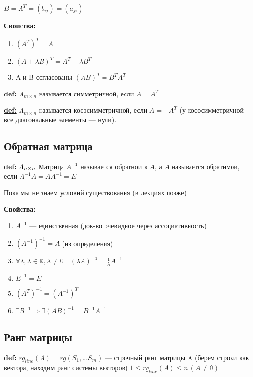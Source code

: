 \( B = A^T = (b_{ij}) = (a_{ji}) \)

\textbf{Свойства:}
\begin{enumerate}
    \item $ (A^T)^T = A $
    \item $ (A+\lambda B)^T = A^T+\lambda B^T $
    \item A и B согласованы $ (AB)^T = B^T A^T $ 
\end{enumerate}

\textbf{\underline{def:}} $ A_{m \times n} $ называется симметричной, если $ A = A^T$

\textbf{\underline{def:}} $ A_{m \times n} $ называется кососимметричной, если $ A = -A^T$ (у кососимметричной все диагональные элементы --- нули).

\subsection{Обратная матрица}

\textbf{\underline{def:}}
\( A_{n \times n} \newline\)
Матрица $ A^{-1} $ называется обратной к $ A $, а $ A $ называется обратимой, если $ A^{-1}A = AA^{-1} = E $

Пока мы не знаем условий существования (в лекциях позже)

\textbf{Свойства:}
\begin{enumerate}
    \item $ A^{-1} $ --- единственная (док-во очевидное через ассоциативность)
    \item $ (A^{-1})^{-1} = A $ (из определения)
    \item $ \forall \lambda, \lambda \in \mathbb{K}, \lambda \ne 0 \quad (\lambda A)^{-1} = \frac{1}{\lambda}A^{-1}$
    \item $ E^{-1} = E $
    \item $ (A^T)^{-1} = (A^{-1})^T $
    \item $ \exists B^{-1} \Rightarrow \exists (AB)^{-1} = B^{-1}A^{-1}$
\end{enumerate}

\subsection{Ранг матрицы}

\textbf{\underline{def:}} $ rg_{line}(A) = rg(S_1, \ldots S_m)$ --- строчный ранг матрицы A (берем строки как вектора, находим ранг системы векторов) $ 1 \leq rg_{line}(A) \leq n \  (A \neq \mathbb{0})$

